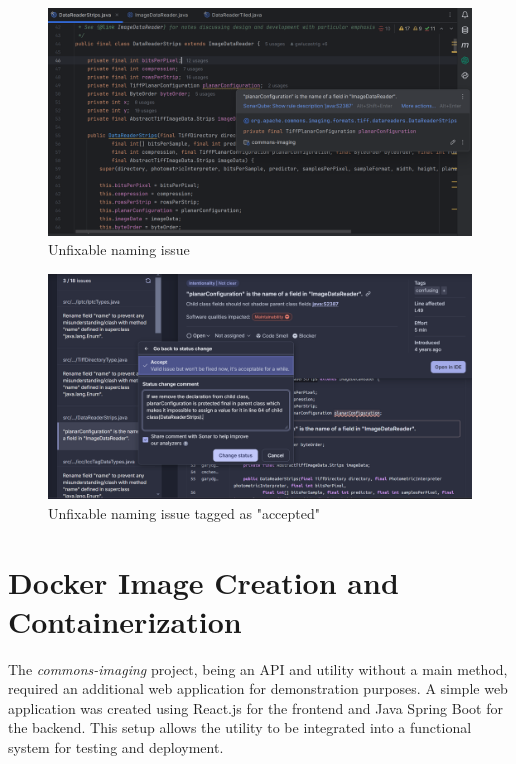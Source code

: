 \documentclass[a4paper,12pt]{report}
\begin{document}
\begin{figure}[H]
    \centering
    \includegraphics[width=1\textwidth]{Report_Img/unfixable_naming_issue.png}
    \caption{Unfixable naming issue}
    \label{fig:unfixable_naming_issue}
\end{figure}

\begin{figure}[H]
    \centering
    \includegraphics[width=1\textwidth]{Report_Img/unfixable_naming_issue_accepted.png}
    \caption{Unfixable naming issue tagged as "accepted"}
    \label{fig:unfixable_naming_issue_accepted}
\end{figure}












\chapter{Docker Image Creation and Containerization}
The \textit{commons-imaging} project, being an API and utility without a main method, required an additional web application for demonstration purposes. A simple web application was created using React.js for the frontend and Java Spring Boot for the backend. This setup allows the utility to be integrated into a functional system for testing and deployment.
\end{document}
